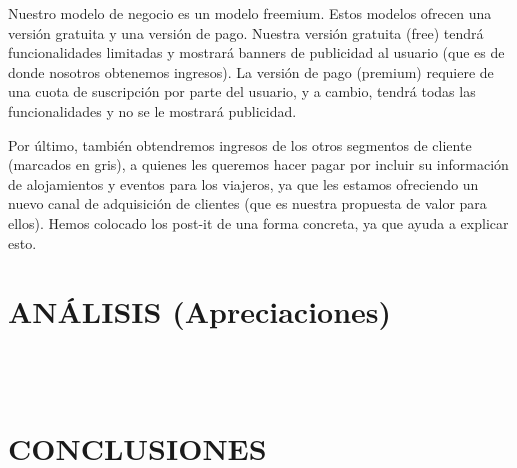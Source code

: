 \documentclass[a4paper,12pt,twocolumn]{article}
\begin{document}
\item Nuestro modelo de negocio es un modelo freemium. Estos modelos ofrecen una versión gratuita y una versión de pago. Nuestra versión gratuita (free) tendrá funcionalidades limitadas y mostrará banners de publicidad al usuario (que es de donde nosotros obtenemos ingresos). La versión de pago (premium) requiere de una cuota de suscripción por parte del usuario, y a cambio, tendrá todas las funcionalidades y no se le mostrará publicidad.

\item Por último, también obtendremos ingresos de los otros segmentos de cliente (marcados en gris), a quienes les queremos hacer pagar por incluir su información de alojamientos y eventos para los viajeros, ya que les estamos ofreciendo un nuevo canal de adquisición de clientes (que es nuestra propuesta de valor para ellos). Hemos colocado los post-it de una forma concreta, ya que ayuda a explicar esto.




\section{ANÁLISIS (Apreciaciones)}

\\
\textbf{}
\\

\section{CONCLUSIONES} 
\end{document}
